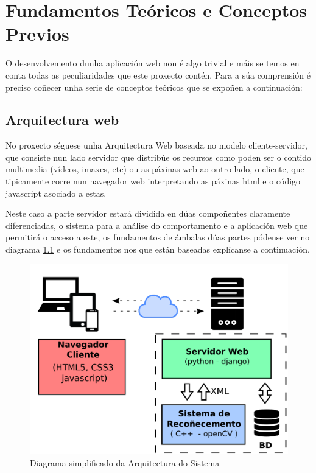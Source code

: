 \chapter{Fundamentos Teóricos e Conceptos Previos}

O desenvolvemento dunha aplicación web non é algo trivial e máis se temos en conta todas
as peculiaridades que este proxecto contén. Para a súa comprensión é preciso coñecer unha
serie de conceptos teóricos que se expoñen a continuación:

\section{Arquitectura web}
	No proxecto séguese unha Arquitectura Web baseada no modelo cliente-servidor, que 
	consiste nun lado servidor que distribúe os recursos como poden ser o contido multimedia
	(vídeos, imaxes, etc) ou as páxinas web ao outro lado, o cliente, que tipicamente corre 
	nun navegador web interpretando as páxinas html e o código javascript asociado a estas.
	
	Neste caso a parte servidor estará dividida en dúas compoñentes claramente diferenciadas,
	o sistema para a análise do comportamento e a aplicación web que permitirá o acceso a este, 
	os fundamentos de ámbalas dúas partes pódense ver no diagrama 
	\ref{fig:ArqSistemaSimplificado} e os fundamentos nos que están baseadas explícanse a 
	continuación.
	
    \begin{figure}[htp]
    \begin{center}
        \includegraphics[scale=0.45]{figures/ArqSistemaSimplificado.pdf}
        \caption{Diagrama simplificado da Arquitectura do Sistema}
    \label{fig:ArqSistemaSimplificado}
    \end{center}
    \end{figure}
	
